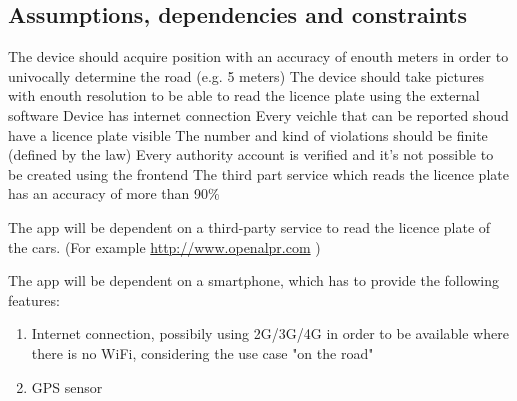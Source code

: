 \subsection{Assumptions, dependencies and constraints}
\begin{enumerate}
 The device should acquire position with an accuracy of enouth meters in order to univocally determine the road (e.g. 5 meters)
 The device should take pictures with enouth resolution to be able to read the licence plate using the external software
\dom{}  Device has internet connection
 Every veichle that can be reported shoud have a licence plate visible
 The number and kind of violations should be finite (defined by the law)
 Every authority account is verified and it's not possible to be created using the frontend
 The third part service which reads the licence plate has an accuracy of more than 90\% 

\end{enumerate}

The app will be dependent on a third-party service to read the licence plate of the cars. (For example \url{http://www.openalpr.com} )


The app will be dependent on a smartphone, which has to provide the following features:
\begin{enumerate}
  \item Internet connection, possibily using 2G/3G/4G in order to be available where there is no WiFi, considering the use case "on the road"
  \item GPS sensor
\end{enumerate}

